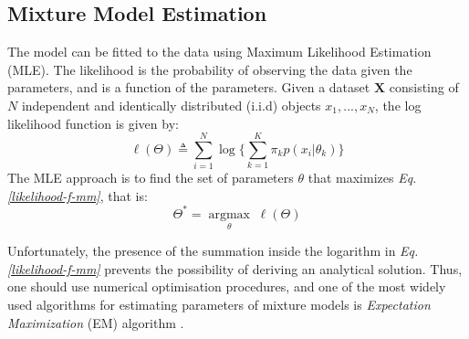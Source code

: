 \subsection{Mixture Model Estimation} \label{mixt-model-estimation-l-sub}
The model can be fitted to the data using Maximum Likelihood Estimation (MLE). The likelihood is the probability of observing the data given the parameters, and is a function of the parameters. Given a dataset $\mathbf{X}$ consisting of $N$ independent and identically distributed (i.i.d) objects $x_{1}, ..., x_{N}$, the log likelihood function is given by:
\begin{equation} \label{likelihood-f-mm}
	\ell(\Theta) \triangleq \sum_{i=1}^{N} \log \bigg\lbrace \sum_{k=1}^{K}\pi_{k}p(x_{i}|\theta_{k})\bigg\rbrace
\end{equation}
The MLE approach is to find the set of parameters $\theta$ that maximizes \emph{Eq. \ref{likelihood-f-mm}}, that is:
\begin{equation} \label{MLE-f-mm}
	\Theta^{*} =  \underset{\theta}{\operatorname{argmax}} \; \ell(\Theta)
\end{equation}

Unfortunately, the presence of the summation inside the logarithm in \emph{Eq. \ref{likelihood-f-mm}} prevents the possibility of deriving an analytical solution. Thus, one should use numerical optimisation procedures, and one of the most widely used algorithms for estimating parameters of mixture models is \emph{Expectation Maximization} (EM) algorithm \citep{Dempster1977}. 
